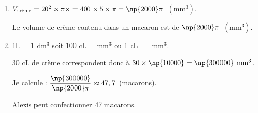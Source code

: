 
\medskip

\begin{enumerate}
\item $V_{\text{crème}} = 20^2 \times \pi \times = 400 \times  5 \times \pi = \np{2000}\pi$~$\left(\text{mm}^3\right)$.

Le volume de crème contenu dans un macaron est de $\np{2000}\pi$~$\left(\text{mm}^3\right)$.
\item 1L = 1 dm$^3$ soit 100 cL =  mm$^3$ ou 1 cL = ~mm$^3$.

30 cL de crème correspondent  donc à $30 \times\np{10000} = \np{300000}~\text{mm}^3$.

Je calcule : $\dfrac{\np{300000}}{\np{2000}\pi} \approx 47,7$~(macarons).

Alexis peut confectionner 47 macarons.
\end{enumerate}
\vspace{0,5cm}

